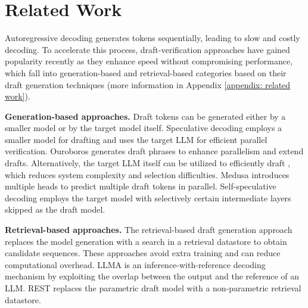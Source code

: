 \section{Related Work}
\label{sec: related work}
Autoregressive decoding generates tokens sequentially, leading to slow and costly decoding. 
To accelerate this process, draft-verification approaches \cite{chen2023accelerating,miao2024specinfer,he2024rest} have gained popularity recently as they enhance speed without compromising performance, which fall into generation-based and retrieval-based categories based on their draft generation techniques (more information in Appendix \ref{appendix: related work}).

\noindent\textbf{Generation-based approaches.}
Draft tokens can be generated either by a smaller model or by the target model itself. 
Speculative decoding \cite{chen2023accelerating, leviathan2023fast} employs a smaller model for drafting and uses the target LLM for efficient parallel verification. Ouroboros \cite{zhao2024ouroboros} generates draft phrases to enhance parallelism and extend drafts.
Alternatively, the target LLM itself can be utilized to efficiently draft \cite{stern2018blockwisedecoding, li2024eagle, fu2024lookahead}, which reduces system complexity and selection difficulties.
Medusa \cite{cai2024medusa} introduces multiple heads to predict multiple draft tokens in parallel.
Self-speculative decoding \cite{zhang2024draft} employs the target model with selectively certain intermediate layers skipped as the draft model.


\noindent\textbf{Retrieval-based approaches.}
The retrieval-based draft generation approach replaces the model generation with a search in a retrieval datastore to obtain candidate sequences. These approaches avoid extra training and can reduce computational overhead.
LLMA \cite{yang2023llma} is an inference-with-reference decoding mechanism by exploiting the overlap between the output and the reference of an LLM.
REST \cite{he2024rest} replaces the parametric draft model with a non-parametric retrieval datastore.